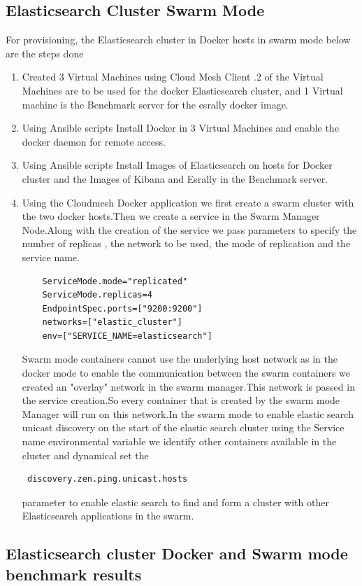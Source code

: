 \documentclass[9pt,twocolumn,twoside]{../../styles/osajnl}
\begin{document}
 \subsection{Elasticsearch Cluster Swarm Mode}
  For provisioning, the Elasticsearch cluster in Docker hosts in swarm mode below are the steps done
\begin{enumerate}
\item Created 3 Virtual Machines using Cloud Mesh Client .2 of the Virtual Machines are to be used for the docker Elasticsearch cluster, and 1 Virtual machine is the Benchmark server for the esrally docker image.
\item Using Ansible scripts Install Docker in 3 Virtual Machines and enable the docker daemon for remote access.
\item Using Ansible scripts Install Images of Elasticsearch on hosts for Docker cluster and the Images of Kibana and Esrally in the Benchmark server.
\item Using the Cloudmesh Docker application we first create a swarm cluster with the two docker hosts.Then we create a service in the Swarm  Manager Node.Along with the creation of the service we pass parameters to specify the number of replicas , the network to be used, the mode of replication and the service name.
\begin{verbatim}
    ServiceMode.mode="replicated" 
    ServiceMode.replicas=4 
    EndpointSpec.ports=["9200:9200"] 
    networks=["elastic_cluster"] 
    env=["SERVICE_NAME=elasticsearch"]
\end{verbatim}

Swarm mode containers cannot use the underlying host network as in the docker mode to enable the communication between the swarm containers we created an "overlay" network in the swarm manager.This network is passed in the service creation.So every container that is created by the swarm mode Manager will run on this network.In the swarm mode to enable elastic search unicast discovery on the start of the elastic search cluster using the Service name environmental variable we identify other containers available in the cluster and dynamical set the \begin{verbatim} discovery.zen.ping.unicast.hosts \end{verbatim} parameter to enable elastic search to find and form a cluster with other Elasticsearch applications in the swarm.

\end{enumerate}

 \subsection{Elasticsearch cluster Docker and Swarm mode benchmark results}
\end{document}
